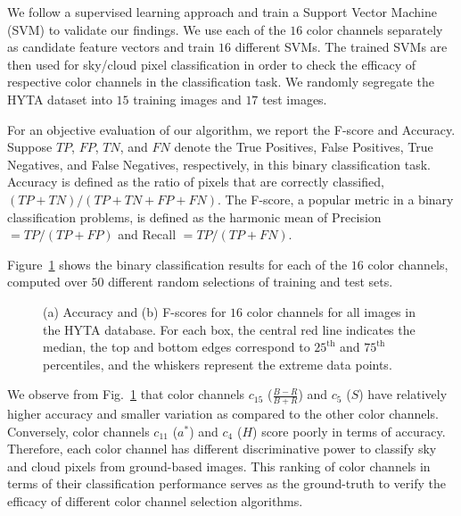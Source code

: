We follow a supervised learning approach and train a Support Vector Machine (SVM) to validate our findings. We use each of the $16$ color channels separately as candidate feature vectors and train $16$ different SVMs. The trained SVMs are then used for sky/cloud pixel classification in order to check the efficacy of respective color channels in the classification task. We randomly  segregate the HYTA dataset into $15$ training images and $17$ test images. 

For an objective evaluation of our algorithm, we report the F-score and Accuracy. Suppose $TP$, $FP$, $TN$, and $FN$ denote the True Positives, False Positives, True Negatives, and False Negatives, respectively, in this binary classification task. Accuracy is defined as the ratio of pixels that are correctly classified, $(TP + TN)/(TP + TN + FP + FN)$. The F-score, a popular metric in a binary classification problems, is defined as the harmonic mean of Precision $= TP/(TP + FP)$ and Recall $= TP/(TP + FN)$.

Figure~\ref{fig:boxplots} shows the binary classification results for each of the $16$ color channels, computed over $50$ different random selections of training and test sets. 

\begin{figure}[htbp]
\centering
{}
\hspace{0.1in}
\caption[Average accuracy and F-score values for $16$ color channels across all image of HYTA database.]{(a) Accuracy and (b) F-scores for $16$ color channels for all images in the HYTA database. For each box, the central red line indicates the median, the top and bottom edges correspond to $25^\textrm{th}$ and $75^\textrm{th}$ percentiles, and the whiskers represent the extreme data points.}
\label{fig:boxplots}
\end{figure}

We observe from Fig.~\ref{fig:boxplots} that color channels $c_{15}$ ($\frac{B-R}{B+R}$) and $c_5$ ($S$) have relatively higher accuracy and smaller variation as compared to the other color channels. Conversely, color channels $c_{11}$ ($a^*$) and $c_4$ ($H$) score poorly in terms of accuracy. Therefore, each color channel has different discriminative power to classify sky and cloud pixels from ground-based images. This ranking of color channels in terms of their classification performance serves as the ground-truth to verify the efficacy of different color channel selection algorithms. 

